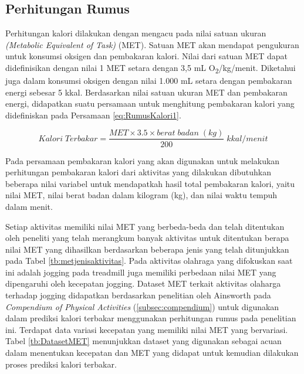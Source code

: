 \subsection{Perhitungan Rumus}
\label{subsec:PrediksiPerhitungan}

Perhitungan kalori dilakukan dengan mengacu pada nilai satuan ukuran \emph{(Metabolic Equivalent of Task)} (MET). Satuan MET akan mendapat pengukuran untuk konsumsi oksigen dan pembakaran kalori. Nilai dari satuan MET dapat didefinisikan dengan nilai 1 MET setara dengan 3,5 mL O\textsubscript{2}/kg/menit. Diketahui juga dalam konsumsi oksigen dengan nilai 1.000 mL setara dengan pembakaran energi sebesar 5 kkal. Berdasarkan nilai satuan ukuran MET dan pembakaran energi, didapatkan suatu persamaan untuk menghitung pembakaran kalori yang didefiniskan pada Persamaan \ref{eq:RumusKalori1}.

\setcounter{chapter}{2}
\setcounter{equation}{0}
\begin{equation}
  Kalori \; Terbakar = \frac{MET \times 3.5 \times berat \; badan \; (kg)}{200} \; kkal/menit
\end{equation}
\setcounter{chapter}{3}
\setcounter{equation}{4}

Pada persamaan pembakaran kalori yang akan digunakan untuk melakukan perhitungan pembakaran kalori dari aktivitas yang dilakukan dibutuhkan beberapa nilai variabel untuk mendapatkah hasil total pembakaran kalori, yaitu nilai MET, nilai berat badan dalam kilogram (kg), dan nilai waktu tempuh dalam menit.

Setiap aktivitas memiliki nilai MET yang berbeda-beda dan telah ditentukan oleh peneliti yang telah merangkum banyak aktivitas untuk ditentukan berapa nilai MET yang dihasilkan berdasarkan beberapa jenis yang telah ditunjukkan pada Tabel \ref{tb:metjenisaktivitas}. Pada aktivitas olahraga yang difokuskan saat ini adalah jogging pada treadmill juga memiliki perbedaan nilai MET yang dipengaruhi oleh kecepatan jogging. Dataset MET terkait aktivitas olaharga terhadap jogging didapatkan berdasarkan penelitian oleh Ainsworth pada \emph{Compendium of Physical Activities} (\ref{subsec:compendium}) untuk digunakan dalam prediksi kalori terbakar menggunakan perhitungan rumus pada penelitian ini. Terdapat data variasi kecepatan yang memiliki nilai MET yang bervariasi. Tabel \ref{tb:DatasetMET} menunjukkan dataset yang digunakan sebagai acuan dalam menentukan kecepatan dan MET yang didapat untuk kemudian dilakukan proses prediksi kalori terbakar.

